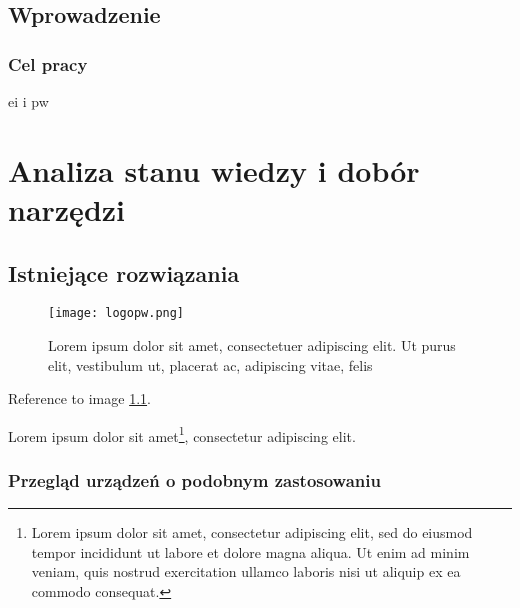 \chapter*{Wprowadzenie}
    \noindent\lipsum[1-3]

    \section*{Cel pracy}
        \noindent\lipsum[4-5]
        \ac{ei} i \ac{pw}

\cleardoublepage
\part{Analiza stanu wiedzy i dobór narzędzi}
\noindent\lipsum[1-3]
\clearpage\chapter{Istniejące rozwiązania}
\noindent\lipsum[1-3]

\begin{figure}[!h]
    \centering \texttt{[image: logopw.png]}
    
    \caption{Lorem ipsum dolor sit amet, consectetuer adipiscing elit. Ut purus
    elit, vestibulum ut, placerat ac, adipiscing vitae, felis}
    \label{fig:tradycyjne-logo-pw}
\end{figure}

\lipsum[1-3] Reference to image \ref{fig:tradycyjne-logo-pw}.

\lipsum[4] Lorem ipsum dolor sit amet\footnote{Lorem ipsum dolor sit amet, consectetur adipiscing elit, sed do eiusmod tempor incididunt ut labore et dolore magna aliqua. Ut enim ad minim veniam, quis nostrud exercitation ullamco laboris nisi ut aliquip ex ea commodo consequat.}, consectetur adipiscing elit.

\section{Przegląd urządzeń o podobnym zastosowaniu}

